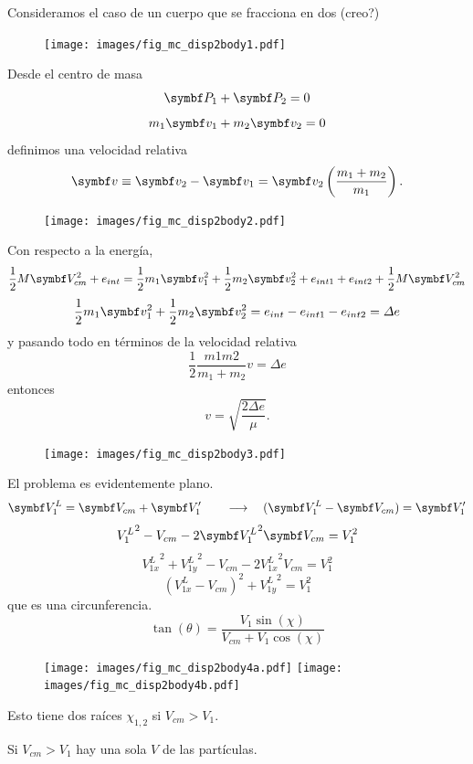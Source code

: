 \documentclass[10pt,oneside]{CBFT_book}
\begin{document}
Consideramos el caso de un cuerpo que se fracciona en dos (creo?)
\begin{figure}[htb]
	\begin{center}
	\texttt{[image: images/fig\_mc\_disp2body1.pdf]}	 
	\end{center}
	\caption{}
\end{figure} 
Desde el centro de masa
\[
	\vb{P}_1 + \vb{P}_2 = 0
\]
\[
	m_1 \vb{v}_1 + m_2 \vb{v}_2 = 0
\]
definimos una velocidad relativa
\[
	\vb{v} \equiv \vb{v}_2  - \vb{v}_1 = \vb{v}_2 \left( \frac{ m_1 + m_2 }{ m_1 }\right) .
\]
\begin{figure}[htb]
	\begin{center}
	\texttt{[image: images/fig\_mc\_disp2body2.pdf]}	 
	\end{center}
	\caption{}
\end{figure} 
Con respecto a la energía,
\[
	\frac{1}{2} M \vb{V}_{cm}^2 + e_{int} = \frac{1}{2} m_1 \vb{v}_1^2 + \frac{1}{2} m_2 \vb{v}_2^2
						+ e_{int 1 } + e_{int 2} + \frac{1}{2} M \vb{V}_{cm}^2
\]
\[
	\frac{1}{2} m_1 \vb{v}_1^2 + \frac{1}{2} m_2 \vb{v}_2^2 = e_{int} - e_{int 1 } - e_{int 2} = \Delta e
\]
y pasando todo en términos de la velocidad relativa
\[
	 \frac{1}{2} \frac{m1 m2}{ m_1 + m_2 } v = \Delta e
\]
entonces 
\[
	v = \sqrt{\frac{ 2 \Delta e}{ \mu } }.
\]
\begin{figure}[htb]
	\begin{center}
	\texttt{[image: images/fig\_mc\_disp2body3.pdf]}	 
	\end{center}
	\caption{}
\end{figure} 

El problema es evidentemente plano.
\[
	\vb{V}_1^L =  \vb{V}_{cm} + \vb{V}_1' \qquad \longrightarrow \quad ( \vb{V}_1^L - \vb{V}_{cm} ) = \vb{V}_1'
\]
\[
	{V_1^L}^2 - V_{cm} - 2 {\vb{V}_1^L}^2 \vb{V}_{cm} = V_1^2
\]
\[
	{V_{1x}^L}^2 + {V_{1y}^L}^2 - V_{cm} - 2 {V_{1x}^L}^2 V_{cm} = V_1^2
\]
\[
	( V_{1x}^L  - V_{cm} )^2 + {V_{1y}^L}^2 = V_1^2
\]
que es una circunferencia.
\[
	\tan(\theta) = \frac{V_1 \sin(\chi) }{ V_{cm} + V_1 \cos(\chi) }
\]
\begin{figure}[htb]
	\begin{center}
	\texttt{[image: images/fig\_mc\_disp2body4a.pdf]}	 
	\texttt{[image: images/fig\_mc\_disp2body4b.pdf]}
	\end{center}
	\caption{}
\end{figure} 

Esto tiene dos raíces $\chi_{1,2}$ si $ V_{cm} > V_1$. 

Si $ V_{cm} > V_1$ hay una sola $V$ de las partículas.
\end{document}

